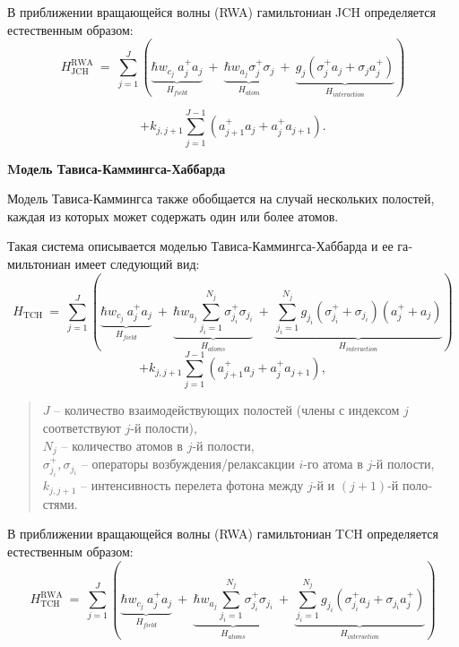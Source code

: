 В приближении вращающейся волны (RWA) \cite{ozhigov_qq,rwa_1,rwa_2} гамильтониан JCH определяется естественным образом:
\[
H_{\text{JCH}}^{\text{RWA}}~=~\sum_{j=1}^J \left(\underbrace{\hbar w_{c_j}\ a_j^+a_j}_{\textstyle H_{field}}~+~\underbrace{\hbar w_{a_j}{\sigma_{j}^+\sigma_{j}}}_{\textstyle H_{atom}}~+~\underbrace{g_j{(\sigma_{j}^+a_j+\sigma_{j}a_j^+)}}_{\textstyle H_{interaction}} \right)
\]

\begin{equation}
	+k_{j,j+1}\sum_{j=1}^{J-1}{\left(a_{j+1}^+a_j+a_{j}^+a_{j+1}\right)}.
\end{equation}

\clearpage
\indent\textbf{Mодель Тависа-Каммингса-Хаббарда}

Модель Тависа-Каммингса также обобщается на случай нескольких поло­стей, каждая из которых может содержать один или более атомов.
\begin{figure}[h!]
	\noindent{}
\end{figure}

Такая система описывается моделью Тависа-Каммингса-Хаббарда и ее га­мильтониан имеет следующий вид:
\[
H_{\text{TCH}}~=~\sum_{j=1}^J \left(\underbrace{\hbar w_{c_{j}}\ a_j^+a_{j}}_{\textstyle H_{field}}~+~\underbrace{\hbar w_{a_{j}}\sum_{j_{i}=1}^{N_{j}}{\sigma_{j_i}^+\sigma_{j_i}}}_{\textstyle H_{atoms}}~+~\underbrace{\sum_{j_{i}=1}^{N_{j}}g_{j_i}{(\sigma_{j_i}^{+}+\sigma_{j_i})(a_{j}^{+}+a_{j})}}_{\textstyle H_{interaction}} \right)
\]
\begin{equation}
	+k_{j,j+1}\sum_{j=1}^{J-1}{\left(a_{j+1}^+a_j+a_{j}^+a_{j+1}\right)},
\end{equation}
\begin{quote}
	$J$ -- количество взаимодействующих полостей (члены с индексом $j$ соответствуют $j$-й полости),\\
	$N_{j}$ -- количество атомов в $j$-й полости,\\
	$\sigma_{j_i}^{+},\sigma_{j_i}$ -- операторы возбуждения/релаксакции $i$-го атома в $j$-й полости,\\
	$k_{j,j+1}$ -- интенсивность перелета фотона между $j$-й и $(j+1)$-й поло­стями.
\end{quote}

В приближении вращающейся волны (RWA) \cite{ozhigov_qq,rwa_1,rwa_2} гамильтониан TCH определяется естественным образом:
\[
H_{\text{TCH}}^{\text{RWA}}~=~\sum_{j=1}^J \left(\underbrace{\hbar w_{c_j}\ a_j^+a_j}_{\textstyle H_{field}}~+~\underbrace{\hbar w_{a_j}\sum_{j_{i}=1}^{N_{j}}{\sigma_{j_i}^+\sigma_{j_i}}}_{\textstyle H_{atoms}}~+~\underbrace{\sum_{j_{i}=1}^{N_{j}}g_{j_i}{(\sigma_{j_i}^+a_j+\sigma_{j_i}a_j^+)}}_{\textstyle H_{interaction}} \right)
\]

